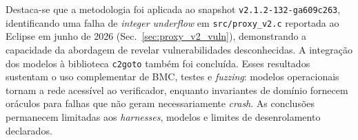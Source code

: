 \documentclass[conference]{IEEEtran}
\newcommand{\mosqsnapshot}{\texttt{v2.1.2-132-ga609c263}}
\begin{document}
Destaca-se que a metodologia foi aplicada ao snapshot \mosqsnapshot,
identificando uma falha de \emph{integer underflow} em
\texttt{src/proxy\_v2.c} reportada ao Eclipse em junho de 2026
(Sec.~\ref{sec:proxy_v2_vuln}),
demonstrando a capacidade da abordagem de revelar vulnerabilidades desconhecidas.
A integra\c{c}\~ao dos modelos \`a biblioteca \texttt{c2goto} tamb\'em foi
conclu\'ida. Esses resultados sustentam o uso complementar de BMC, testes e
\emph{fuzzing}: modelos operacionais tornam a rede acess\'ivel ao verificador,
enquanto invariantes de dom\'inio fornecem or\'aculos para falhas que n\~ao geram
necessariamente \emph{crash}. As conclus\~oes permanecem limitadas aos
\emph{harnesses}, modelos e limites de desenrolamento declarados.



\end{document}
